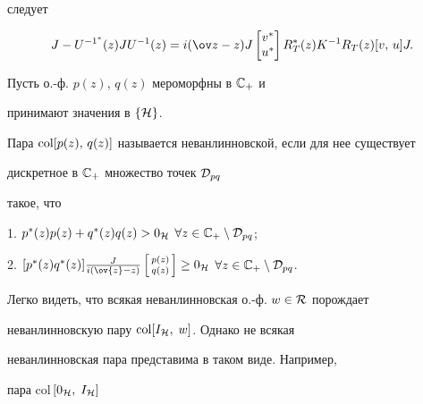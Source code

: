 следует


\begin{equation}


J-U^{-1^*}(z)JU^{-1}(z)=i(\ov z-z)


J\begin{bmatrix} v^* \\ u^* \end{bmatrix}


R_{T}^*(z)K^{-1}R_{T}(z)


[v,\, u]J.


\end{equation}





\begin{defn}


Пусть о.-ф. $p(z)$, $q(z)$ мероморфны в ${\Bbb C}_+ $ и


принимают значения в $\{\cal H\}$.


Пара $\operatorname{col}[p(z),\, q(z)]$ называется неванлинновской, если для нее существует


дискретное в ${\Bbb C}_+ $ множество точек ${\cal D}_{pq}$


такое, что





1. $p^*(z)p(z)+q^*(z)q(z) > 0_{\cal H}$ $\forall z\in


{\Bbb C}_+ \setminus {\cal D}_{pq} $;





2. $[p^*(z)q^*(z)]\frac{J}{i(\ov{z}-z)}


\left[\begin{smallmatrix} p(z)\\q(z)\end{smallmatrix}


\right] \geq 0_{\cal H}$ $\forall z\in {\Bbb C}_{+}


\setminus {\cal D}_{pq} $.


\end{defn}





Легко видеть, что всякая неванлинновская о.-ф. $w\in \cal R $ порождает


неванлинновскую пару $\operatorname{col}[I_{\cal H},\; w]$. Однако не всякая


неванлинновская пара представима в таком виде. Например,


пара col\,$ [0_{\cal H},\; I_{\cal H}] $


